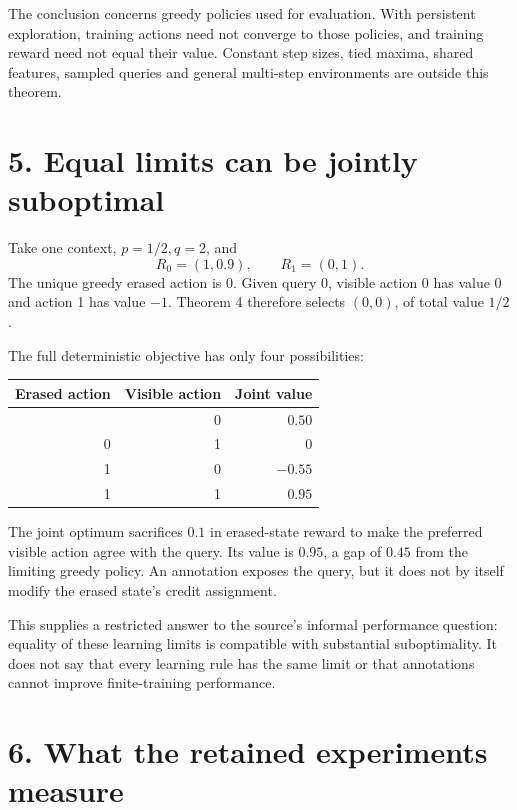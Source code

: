 \documentclass[
  11pt,
  letterpaper,
]{article}
\newcounter{none} %
\begin{document}
The conclusion concerns greedy policies used for evaluation. With
persistent exploration, training actions need not converge to those
policies, and training reward need not equal their value. Constant step
sizes, tied maxima, shared features, sampled queries and general
multi-step environments are outside this theorem.

\section{5. Equal limits can be jointly
suboptimal}\label{equal-limits-can-be-jointly-suboptimal}

Take one context, \(p=1/2,q=2\), and \[
                       R_0=(1,0.9),\qquad R_1=(0,1).
\] The unique greedy erased action is 0. Given query 0, visible action 0
has value 0 and action 1 has value \(-1\). Theorem 4 therefore selects
\((0,0)\), of total value \(1/2\).

The full deterministic objective has only four possibilities:

{\def\LTcaptype{none} %
\begin{longtable}[]{@{}rrr@{}}
\toprule\noalign{}
Erased action & Visible action & Joint value \\
\midrule\noalign{}
\endhead
\bottomrule\noalign{}
\endlastfoot
0 & 0 & \(0.50\) \\
0 & 1 & \(0\) \\
1 & 0 & \(-0.55\) \\
1 & 1 & \(0.95\) \\
\end{longtable}
}

The joint optimum sacrifices \(0.1\) in erased-state reward to make the
preferred visible action agree with the query. Its value is \(0.95\), a
gap of \(0.45\) from the limiting greedy policy. An annotation exposes
the query, but it does not by itself modify the erased state's credit
assignment.

This supplies a restricted answer to the source's informal performance
question: equality of these learning limits is compatible with
substantial suboptimality. It does not say that every learning rule has
the same limit or that annotations cannot improve finite-training
performance.

\section{6. What the retained experiments
measure}\label{what-the-retained-experiments-measure}
\end{document}
